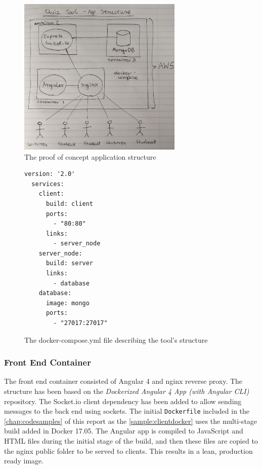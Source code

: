 \begin{figure}[ht]
    \centering
    \includegraphics[width=0.7\textwidth]{../../design/app_structure.jpg}
    \caption{The proof of concept application structure}
    \label{fig:appstrucure}
\end{figure}

\begin{figure}[h!]
  \begin{lstlisting}[basicstyle=\small]
  version: '2.0'
  services:
    client:
      build: client
      ports:
        - "80:80"
      links:
        - server_node
    server_node:
      build: server
      links:
        - database
    database:
      image: mongo
      ports:
        - "27017:27017"
  \end{lstlisting}
  \caption{The docker-compose.yml file describing the tool's structure}
\end{figure}

\newpage
\subsubsection{Front End Container}
\label{section:frontendcontainer}
The front end container consisted of Angular 4 and nginx reverse proxy. The structure
has been based on the \textit{Dockerized Angular 4 App (with Angular CLI)} repository\cite{35}.
The Socket.io client dependency has been added to allow sending messages to the back end
using sockets. The initial \texttt{Dockerfile} included in the \autoref{chap:codesamples} of this report
as the \autoref{sample:clientdocker} uses the multi-stage build added in Docker 17.05. The
Angular app is compiled to JavaScript and HTML files during the initial stage of the build,
and then these files are copied to the nginx public folder to be served to clients.
This results in a lean, production ready image.

